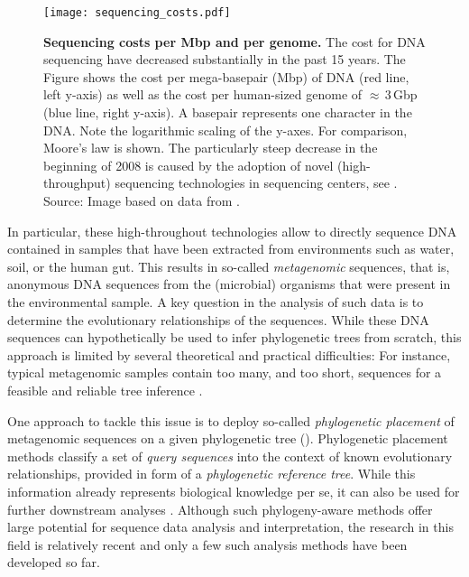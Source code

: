 \begin{figure}[hbt]
    \centering
    \texttt{[image: sequencing\_costs.pdf]}
    \caption[Sequencing costs per Mbp and per genome]{
        \textbf{Sequencing costs per Mbp and per genome.}
        The cost for DNA sequencing have decreased substantially in the past 15 years.
        The Figure shows the cost per mega-basepair (Mbp) of DNA (red line, left y-axis)
        as well as the cost per human-sized genome of $\approx$\,\num{3}\,Gbp (blue line, right y-axis).
        A basepair represents one character in the DNA.
        Note the logarithmic scaling of the y-axes.
        For comparison, Moore's law \cite{Moore1965} is shown.
        The particularly steep decrease in the beginning of 2008 is caused by
        the adoption of novel (high-throughput) sequencing technologies in sequencing centers,
        see .
        Source: Image based on data from \cite{Wetterstrand2018}.
    }
    \label{fig:sequencing_costs}
\end{figure}

In particular, these high-throughout technologies allow to directly sequence DNA contained in samples
that have been extracted from environments such as water, soil, or the human gut.
This results in so-called \emph{metagenomic} sequences,
that is, anonymous DNA sequences from the (microbial) organisms that were present in the environmental sample.
A key question in the analysis of such data is to determine the evolutionary relationships of the sequences.
While these DNA sequences can hypothetically be used to infer phylogenetic trees from scratch,
this approach is limited by several theoretical and practical difficulties:
For instance, typical metagenomic samples contain too many, and too short, sequences
for a feasible and reliable tree inference \cite{Matsen2010,Janssen2018}.

One approach to tackle this issue is to deploy so-called \emph{phylogenetic placement} \cite{Matsen2010,Berger2011}
of metagenomic sequences on a given phylogenetic tree ().
Phylogenetic placement methods classify a set of \emph{query sequences}
into the context of known evolutionary relationships, provided in form of a \emph{phylogenetic reference tree}.
While this information already represents biological knowledge per se,
it can also be used for further downstream analyses \cite{Matsen2011a}.
Although such phylogeny-aware methods offer large potential for sequence data analysis and interpretation,
the research in this field is relatively recent and only a few such analysis methods have been developed so far.


